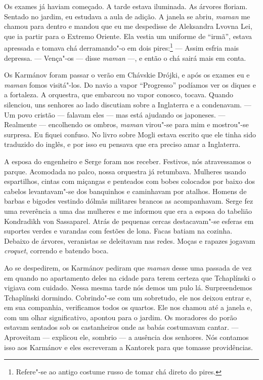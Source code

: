 Os exames já haviam começado. A tarde estava iluminada. As árvores
floriam. Sentado no jardim, eu estudava a aula de adição. A janela se
abriu, \emph{maman} me chamou para dentro e mandou que eu me despedisse
de Aleksandra Lvovna Lei, que ia partir para o Extremo Oriente. Ela
vestia um uniforme de ``irmã'', estava apressada e tomava chá
derramando"-o em dois pires:\footnote{Refere"-se ao antigo costume russo
  de tomar chá direto do pires.} --- Assim esfria mais depressa. ---
Vença"-os --- disse \emph{maman} ---, e então o chá sairá mais em conta.

Os Karmánov foram passar o verão em Chávskie Drójki, e após os exames eu
e \emph{maman} fomos visitá"-los. Do navio a vapor ``Progresso'' podíamos
ver os diques e a fortaleza. A orquestra, que embarcou no vapor conosco,
tocava. Quando silenciou, uns senhores ao lado discutiam sobre a
Inglaterra e a condenavam. --- Um povo cristão --- falavam eles --- mas
está ajudando os japoneses. --- Realmente --- encolhendo os ombros,
\emph{maman} virou"-se para mim e mostrou"-se surpresa. Eu fiquei confuso.
No livro sobre Mogli estava escrito que ele tinha sido traduzido do
inglês, e por isso eu pensava que era preciso amar a Inglaterra.

A esposa do engenheiro e Serge foram nos receber. Festivos, nós
atravessamos o parque. Acomodada no palco, nossa orquestra já retumbava.
Mulheres usando espartilhos, cintas com miçangas e penteados com bobes
colocados por baixo dos cabelos levantavam"-se dos banquinhos e
caminhavam por atalhos. Homens de barbas e bigodes vestindo dólmãs
militares brancos as acompanhavam. Serge fez uma reverência a uma das
mulheres e me informou que era a esposa do tabelião Kondradikh von
Sassaparel. Atrás de pequenas cercas destacavam"-se esferas em suportes
verdes e varandas com festões de lona. Facas batiam na cozinha. Debaixo
de árvores, veranistas se deleitavam nas redes. Moças e rapazes jogavam
\emph{croquet}, correndo e batendo boca.

Ao se despedirem, os Karmánov pediram que \emph{maman} desse uma passada
de vez em quando no apartamento deles na cidade para terem certeza que
Tchaplínski o vigiava com cuidado. Nessa mesma tarde nós demos um pulo
lá. Surpreendemos Tchaplínski dormindo. Cobrindo"-se com um sobretudo,
ele nos deixou entrar e, em sua companhia, verificamos todos os quartos.
Ele nos chamou até a janela e, com um olhar significativo, apontou para
o jardim. Os moradores do porão estavam sentados sob os castanheiros
onde as babás costumavam cantar. --- Aproveitam --- explicou ele,
sombrio --- a ausência dos senhores. Nós contamos isso aos Karmánov e
eles escreveram a Kantorek para que tomasse providências.


